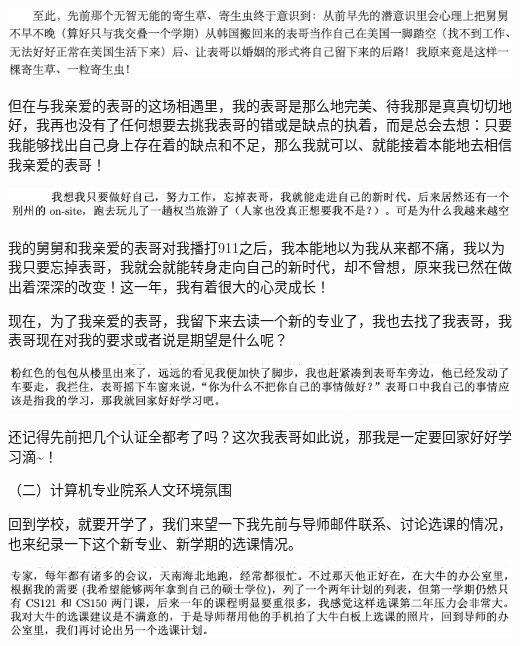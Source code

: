 \documentclass[9pt, b5paper]{article}
\begin{document}
\begin{center}
\includegraphics[width=.9\linewidth]{./pic/backups_plans_20210424_091855.png}
\end{center}

但在与我亲爱的表哥的这场相遇里，我的表哥是那么地完美、待我那是真真切切地好，我再也没有了任何想要去挑我表哥的错或是缺点的执着，而是总会去想：只要我能够找出自己身上存在着的缺点和不足，那么我就可以、就能接着本能地去相信我亲爱的表哥！

\begin{center}
\includegraphics[width=.9\linewidth]{./pic/backups_plans_20210424_090155.png}
\end{center}

我的舅舅和我亲爱的表哥对我播打911之后，我本能地以为我从来都不痛，我以为我只要忘掉表哥，我就会就能转身走向自己的新时代，却不曾想，原来我已然在做出着深深的改变！这一年，我有着很大的心灵成长！

现在，为了我亲爱的表哥，我留下来去读一个新的专业了，我也去找了我表哥，我表哥现在对我的要求或者说是期望是什么呢？

\begin{center}
\includegraphics[width=.9\linewidth]{./pic/backups_plans_20210424_092138.png}
\end{center}

还记得先前把几个认证全都考了吗？这次我表哥如此说，那我是一定要回家好好学习滴\textasciitilde{}！

（二）计算机专业院系人文环境氛围

回到学校，就要开学了，我们来望一下我先前与导师邮件联系、讨论选课的情况，也来纪录一下这个新专业、新学期的选课情况。

\begin{center}
\includegraphics[width=.9\linewidth]{./pic/backups_plans_20210424_113709.png}
\end{center}
\end{document}

